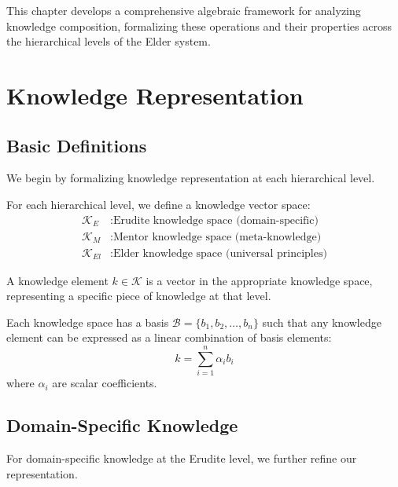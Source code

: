This chapter develops a comprehensive algebraic framework for analyzing knowledge composition, formalizing these operations and their properties across the hierarchical levels of the Elder system.

\section{Knowledge Representation}

\subsection{Basic Definitions}

We begin by formalizing knowledge representation at each hierarchical level.

\begin{definition}
For each hierarchical level, we define a knowledge vector space:
\begin{align}
\mathcal{K}_E &: \text{Erudite knowledge space (domain-specific)} \\
\mathcal{K}_M &: \text{Mentor knowledge space (meta-knowledge)} \\
\mathcal{K}_{El} &: \text{Elder knowledge space (universal principles)}
\end{align}
\end{definition}

\begin{definition}
A knowledge element $k \in \mathcal{K}$ is a vector in the appropriate knowledge space, representing a specific piece of knowledge at that level.
\end{definition}

\begin{definition}
Each knowledge space has a basis $\mathcal{B} = \{b_1, b_2, \ldots, b_n\}$ such that any knowledge element can be expressed as a linear combination of basis elements:
\begin{equation}
k = \sum_{i=1}^{n} \alpha_i b_i
\end{equation}
where $\alpha_i$ are scalar coefficients.
\end{definition}

\subsection{Domain-Specific Knowledge}

For domain-specific knowledge at the Erudite level, we further refine our representation.

